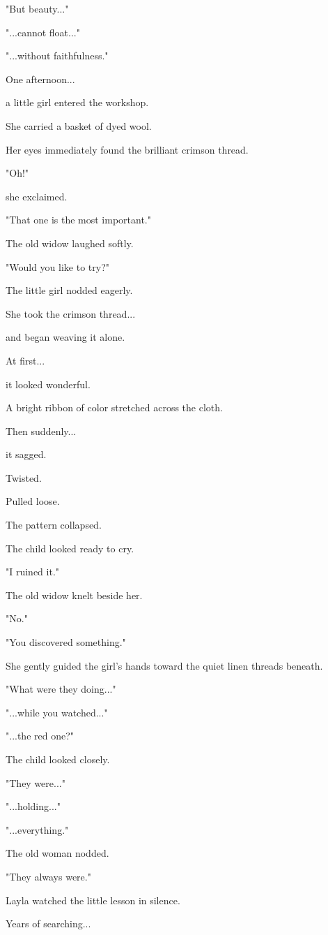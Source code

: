 \documentclass[12pt,openany]{book}
\begin{document}
"But beauty..."

"...cannot float..."

"...without faithfulness."

One afternoon...

a little girl entered the workshop.

She carried a basket of dyed wool.

Her eyes immediately found the brilliant crimson thread.

"Oh!"

she exclaimed.

"That one is the most important."

The old widow laughed softly.

"Would you like to try?"

The little girl nodded eagerly.

She took the crimson thread...

and began weaving it alone.

At first...

it looked wonderful.

A bright ribbon of color stretched across the cloth.

Then suddenly...

it sagged.

Twisted.

Pulled loose.

The pattern collapsed.

The child looked ready to cry.

"I ruined it."

The old widow knelt beside her.

"No."

"You discovered something."

She gently guided the girl's hands toward the quiet linen threads beneath.

"What were they doing..."

"...while you watched..."

"...the red one?"

The child looked closely.

"They were..."

"...holding..."

"...everything."

The old woman nodded.

"They always were."

Layla watched the little lesson in silence.

Years of searching...
\end{document}
